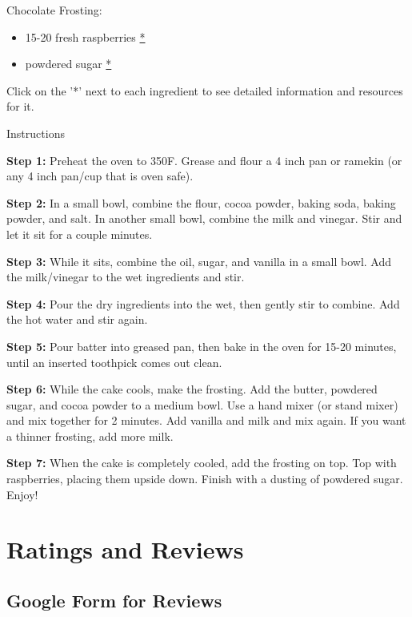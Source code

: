 \documentclass[
]{book}
\providecommand{\tightlist}{%
  \setlength{\itemsep}{0pt}\setlength{\parskip}{0pt}}
\begin{document}
Chocolate Frosting:

\begin{itemize}
\tightlist
\item
  15-20 fresh raspberries
  \href{https://www.publix.com/pd/red-raspberries/RIO-PCI-107475?origin=search1}{*}
\item
  powdered sugar
  \href{https://www.publix.com/pd/publix-powdered-sugar-confectioners/RIO-PCI-127078?origin=search1}{*}
\end{itemize}

Click on the '*' next to each ingredient to see detailed information and
resources for it.

Instructions

\textbf{Step 1:} Preheat the oven to 350F. Grease and flour a 4 inch pan
or ramekin (or any 4 inch pan/cup that is oven safe).

\textbf{Step 2:} In a small bowl, combine the flour, cocoa powder,
baking soda, baking powder, and salt. In another small bowl, combine the
milk and vinegar. Stir and let it sit for a couple minutes.

\textbf{Step 3:} While it sits, combine the oil, sugar, and vanilla in a
small bowl. Add the milk/vinegar to the wet ingredients and stir.

\textbf{Step 4:} Pour the dry ingredients into the wet, then gently stir
to combine. Add the hot water and stir again.

\textbf{Step 5:} Pour batter into greased pan, then bake in the oven for
15-20 minutes, until an inserted toothpick comes out clean.

\textbf{Step 6:} While the cake cools, make the frosting. Add the
butter, powdered sugar, and cocoa powder to a medium bowl. Use a hand
mixer (or stand mixer) and mix together for 2 minutes. Add vanilla and
milk and mix again. If you want a thinner frosting, add more milk.

\textbf{Step 7:} When the cake is completely cooled, add the frosting on
top. Top with raspberries, placing them upside down. Finish with a
dusting of powdered sugar. Enjoy!

\chapter*{Ratings and Reviews}\label{ratings-and-reviews}

\section*{Google Form for Reviews}\label{google-form-for-reviews}
\end{document}
